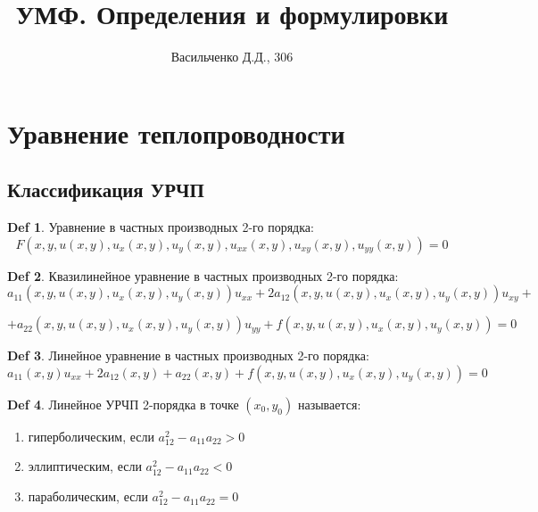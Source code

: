 \documentclass[14pt]{article}
\author{Васильченко Д.Д., 306}
\title{УМФ. Определения и формулировки}
\theoremstyle{plain}
\theoremstyle{definition}
\newtheorem{Def}{Def}
\begin{document}
	\maketitle
	\section{Уравнение теплопроводности}
	\subsection{Классификация УРЧП}
	\begin{Def}
		Уравнение в частных производных 2-го порядка: 
		$$
		F(x, y, u(x,y), u_x(x,y), u_y(x,y), u_{xx}(x,y), u_{xy}(x,y), u_{yy}(x,y)) = 0
		$$
	\end{Def}
	\begin{Def}
		Квазилинейное уравнение в частных производных 2-го порядка: 
		$$
			a_{11}(x,y, u(x,y), u_x(x,y), u_y(x,y)) u_{xx} + 2a_{12} (x,y, u(x,y), u_x(x,y), u_y(x,y)) u_{xy} + $$
			
			$$+ a_{22}(x,y, u(x,y), u_x(x,y), u_y(x,y))u_{yy} + f(x,y, u(x,y), u_x(x,y), u_y(x,y)) = 0
		$$
	\end{Def}
	\begin{Def}
		Линейное уравнение в частных производных 2-го порядка:
		$$
			a_{11}(x,y) u_{xx} + 2a_{12}(x,y) + a_{22}(x,y) + f(x,y, u(x,y), u_x(x,y), u_y(x,y)) = 0
		$$
	\end{Def}
	
	\begin{Def}
		Линейное УРЧП 2-порядка в точке $(x_0, y_0)$ называется: 
		\begin{enumerate}
			\item гиперболическим, если $a^2_{12} - a_{11}a_{22} > 0$
			\item эллиптическим, если $a^2_{12} - a_{11}a_{22} < 0$
			\item параболическим, если $a^2_{12} - a_{11}a_{22} = 0$
		\end{enumerate}
	\end{Def}
\end{document}
